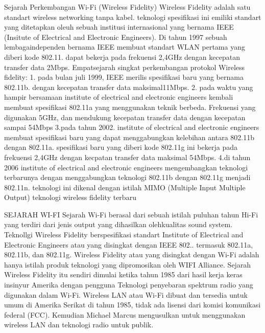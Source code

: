 Sejarah Perkembangan Wi-Fi (Wireless Fidelity)
Wireless Fidelity adalah satu standart wireless networking tanpa kabel. teknologi spesifikasi ini emiliki standart yang ditetapkan oleuh sebuah institusi internasional yang bernama IEEE  (Insitute of Electrical and Electronic Engineers). Di tahun 1997 sebuah lembagaindependen bernama IEEE membuat standart WLAN pertama yang diberi kode 802.11. dapat bekerja pada frekuensi 2,4GHz dengan kecepatan transfer data 2Mbps.
Empatsejarah singkat perkembangan protokol Wireless fidelity:
1. pada bulan juli 1999, IEEE merilis spesifikasi baru yang bernama 802.11b. dengan kecepatan transfer data maksimal11Mbps.
2. pada waktu yang hampir bersamaan institute of electrical and electronic engineers kembali membuat spesifikasi 802.11a yang menggunakan teknik berbeda. Frekuensi yang  digunakan 5GHz, dan mendukung kecepatan transfer data dengan kecepatan sampai 54Mbps
3.pada tahun 2002. institute of electrical and electronic engineers membuat spesifikasi baru yang dapat menggabungkan kelebihan antara 802.11b dengan 802.11a. spesifikasi baru  yang diberi kode 802.11g ini bekerja pada frekuensi 2,4GHz dengan kecpatan transfer data maksimal 54Mbps.
4.di tahun 2006 institute of electrical and electronic engineers mengembangkan teknologi terbarunya dengan menggabungkan teknologi 802.11b dengan 802.11g menjadi 802.11n. teknologi ini dikenal dengan istilah MIMO (Multiple Input Multiple Output) teknologi wireless fidelity terbaru
 
SEJARAH WI-FI
Sejarah Wi-Fi berasal dari sebuah istilah puluhan tahun Hi-Fi yang terdiri dari jenis output yang dihasilkan olehkualitas sound system. Teknollgi Wireless Fidelity berspesifikasi standart Institute of Electrical and Electronic Engineers atau yang disingkat dengan IEEE 802.. termasuk 802.11a, 802.11b, dan 802.11g. Wireless Fidelity atau yang disingkat dengan Wi-Fi adalah hanya istilah produk teknologi yang dipromosikan oleh WIFI Alliance.
Sejarah Wireless Fidelity itu sendiri dimulai ketika tahun 1985 dari hasil kerja keras insinyur Amerika dengan pengguna Teknologi penyebaran spektrum radio yang digunakan dalam Wi-Fi. Wireless LAN atau Wi-Fi dibuat dan tersedia untuk umum di Amerika Serikat di tahun 1985, tidak ada lisensi dari komisi komunikasi federal (FCC). Kemudian Michael Marcus mengusulkan untuk menggunakan wireless LAN dan teknologi radio untuk publik.
